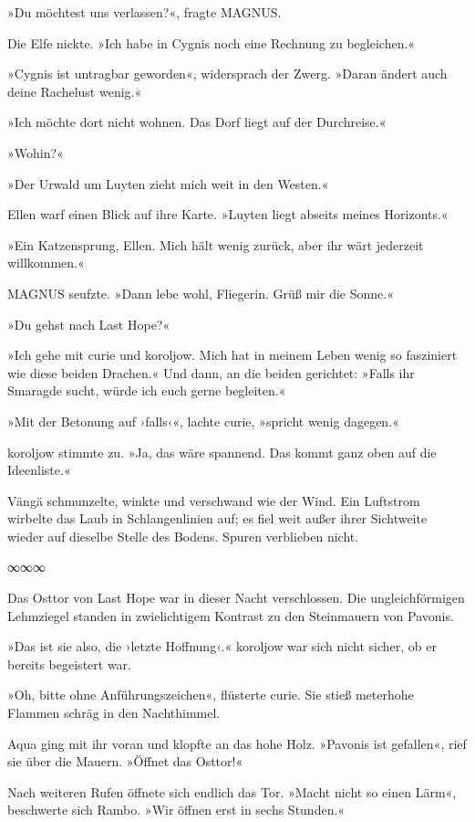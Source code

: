 »Du möchtest uns verlassen?«, fragte MAGNUS.

Die Elfe nickte. »Ich habe in Cygnis noch eine Rechnung zu begleichen.«

»Cygnis ist untragbar geworden«, widersprach der Zwerg. »Daran ändert auch deine Rachelust wenig.«

»Ich möchte dort nicht wohnen. Das Dorf liegt auf der Durchreise.«

»Wohin?«

»Der Urwald um Luyten zieht mich weit in den Westen.«

Ellen warf einen Blick auf ihre Karte. »Luyten liegt abseits meines Horizonts.«

»Ein Katzensprung, Ellen. Mich hält wenig zurück, aber ihr wärt jederzeit willkommen.«

MAGNUS seufzte. »Dann lebe wohl, Fliegerin. Grüß mir die Sonne.«

»Du gehst nach Last Hope?«

»Ich gehe mit curie und koroljow. Mich hat in meinem Leben wenig so fasziniert wie diese beiden Drachen.« Und dann, an die beiden gerichtet: »Falls ihr Smaragde sucht, würde ich euch gerne begleiten.«

»Mit der Betonung auf ›falls‹«, lachte curie, »spricht wenig dagegen.«

koroljow stimmte zu. »Ja, das wäre spannend. Das kommt ganz oben auf die Ideenliste.«

Vängä schmunzelte, winkte und verschwand wie der Wind. Ein Luftstrom wirbelte das Laub in Schlangenlinien auf; es fiel weit außer ihrer Sichtweite wieder auf dieselbe Stelle des Bodens. Spuren verblieben nicht.

\begin{center}
∞∞∞
\end{center}

Das Osttor von Last Hope war in dieser Nacht verschlossen. Die ungleichförmigen Lehmziegel standen in zwielichtigem Kontrast zu den Steinmauern von Pavonis.

»Das ist sie also, die ›letzte Hoffnung‹.« koroljow war sich nicht sicher, ob er bereits begeistert war.

»Oh, bitte ohne Anführungszeichen«, flüsterte curie. Sie stieß meterhohe Flammen schräg in den Nachthimmel.

Aqua ging mit ihr voran und klopfte an das hohe Holz. »Pavonis ist gefallen«, rief sie über die Mauern. »Öffnet das Osttor!«

Nach weiteren Rufen öffnete sich endlich das Tor. »Macht nicht so einen Lärm«, beschwerte sich Rambo. »Wir öffnen erst in sechs Stunden.«

